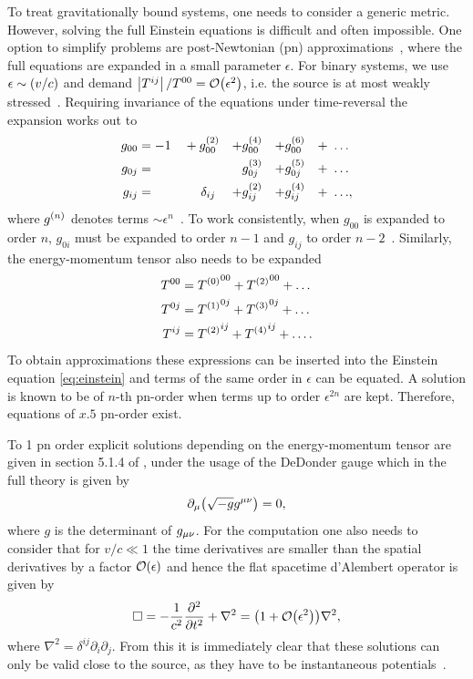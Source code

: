 To treat gravitationally bound systems, one needs to consider a generic metric. However, solving the full Einstein equations is difficult and often impossible. One option to simplify problems are post-Newtonian (\acrshort{pn}) approximations~\cite{Misner:1973aaa}, %
where the full equations are expanded in a small parameter $\epsilon$. For binary systems, we use $\epsilon\sim{\left( v/c \right)}$ and demand $\left|T^{ij}\right| / T^{00}=\mathcal{O}{\left( \epsilon^2 \right)}$, i.e. the source is at most weakly stressed~\cite{Maggiore:2008aaa}. %
Requiring invariance of the equations under time-reversal the expansion works out to
\begin{align}
g_{00} & = -1 & & + g^{{\left( 2 \right)}}_{00} & + g^{\left( 4 \right)}_{00} & & + g^{\left( 6 \right)}_{00} & & +\ \dots & \nonumber\\
g_{0j} & = & & & \phantom{+}g^{\left( 3 \right)}_{0j}  & & + g^{\left( 5 \right)}_{0j} & & +\ \dots & \\
g_{ij} & = & & \hspace{0.2cm}\phantom{+}\delta_{ij} & + g^{\left( 2 \right)}_{ij} & & + g^{\left( 4 \right)}_{ij} & & +\ \dots & ,\nonumber
\end{align}
where $g^{\left( n \right)}$ denotes terms $\sim \epsilon^n$~\cite{Maggiore:2008aaa}. %
To work consistently, when $g_{00}$ is expanded to order $n$, $g_{0i}$ must be expanded to order $n-1$ and $g_{ij}$ to order $n-2$~\cite{Maggiore:2008aaa}. %
Similarly, the energy-momentum tensor also needs to be expanded
\begin{align}
T^{00} & = {T^{\left( 0 \right)}}^{00} + {T^{\left( 2 \right)}}^{00} + \dots\nonumber\\
T^{0j} & = {T^{\left( 1 \right)}}^{0j} + {T^{\left( 3 \right)}}^{0j} + \dots\\
T^{ij} & = {T^{\left( 2 \right)}}^{ij} + {T^{\left( 4 \right)}}^{ij} + \dots.\nonumber
\end{align}
To obtain approximations these expressions can be inserted into the Einstein equation \eqref{eq:einstein} and terms of the same order in $\epsilon$ can be equated. A solution is known to be of $n$-th \acrshort{pn}-order when terms up to order $\epsilon^{2n}$ are kept. Therefore, equations of $x.5$ \acrshort{pn}-order exist.

To 1 \acrshort{pn} order explicit solutions depending on the energy-momentum tensor are given in section 5.1.4 of \cite{Maggiore:2008aaa}, under the usage of the DeDonder gauge which in the full theory is given by
\begin{equation}
\partial_\mu{\left( \sqrt{-g}g^{\mu\nu}\right)}=0,
\end{equation}
where $g$ is the determinant of $g_{\mu\nu}$. For the computation one also needs to consider that for $v/c\ll 1$ the time derivatives are smaller than the spatial derivatives by a factor $\mathcal{O}{\left( \epsilon \right)}$ and hence the flat spacetime d'Alembert operator is given by
\begin{equation}\label{eq:pn_dalembert}
\Box = -\frac{1}{c^2}\frac{\partial^2}{\partial t^2}+\nabla^2 = {\left( 1+\mathcal{O}{\left( \epsilon^2 \right)} \right)}\nabla^2,
\end{equation}
where $\nabla^2=\delta^{ij}\partial_i\partial_j$. From this it is immediately clear that these solutions can only be valid close to the source, as they have to be instantaneous potentials~\cite{Maggiore:2008aaa}.%

